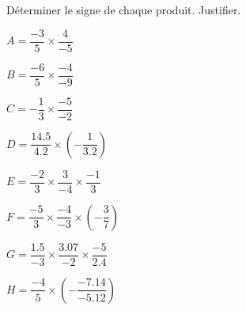 \begin{exercice*}
    Déterminer le signe de chaque produit. Justifier.

    \hspace*{-10mm}
    \begin{minipage}{1.1\linewidth}
    \begin{multicols}{2}
        \begin{spacing}{2}
            \begin{list}{}{}
                \item $A=\dfrac{-3}{5}\times\dfrac{4}{-5}$
                \item $B=\dfrac{-6}{5}\times\dfrac{-4}{-9}$
                \item $C=-\dfrac{1}{3}\times\dfrac{-5}{-2}$
                \item $D=\dfrac{\num{14.5}}{\num{4.2}}\times\left(-\dfrac{1}{\num{3.2}}\right)$
                \item $E=\dfrac{-2}{3}\times\dfrac{3}{-4}\times\dfrac{-1}{3}$
                \item $F=\dfrac{-5}{3}\times\dfrac{-4}{-3}\times\left(-\dfrac{3}{7}\right)$
                \item $G=\dfrac{\num{1.5}}{-3}\times\dfrac{\num{3.07}}{-2}\times\dfrac{-5}{\num{2.4}}$
                \item $H=\dfrac{-4}{5}\times\left(-\dfrac{\num{-7.14}}{\num{-5.12}}\right)$
            \end{list}
        \end{spacing}
    \end{multicols}
    \end{minipage}
\end{exercice*}
